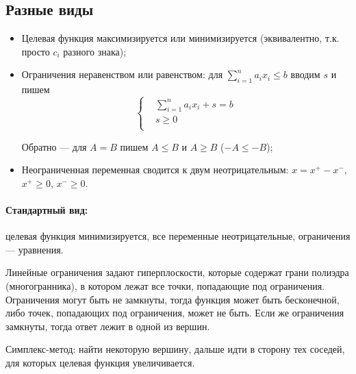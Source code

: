 \subsection{Разные виды}
\begin{itemize}
    \item Целевая функция максимизируется или минимизируется
    (эквивалентно, т.к. просто $c_i$ разного знака);

    \item Ограничения неравенством или равенством:
    для $\sum_{i=1}^n a_i x_i \le b$
    вводим $s$ и пишем
    \[
        \left\{
        \begin{aligned}
            & \sum_{i=1}^n a_i x_i + s = b \\
            & s \ge 0 \\
        \end{aligned}
        \right.
    \]

    Обратно --- для $A = B$ пишем $A \le B$ и $A \ge B$ ($-A \le -B$);

    \item Неограниченная переменная сводится к двум неотрицательным:
    $x = x^+ - x^-$, $x^+ \ge 0$, $x^- \ge 0$.
\end{itemize}

\paragraph{Стандартный вид:}
целевая функция минимизируется,
все переменные неотрицательные,
ограничения --- уравнения.

Линейные ограничения задают гиперплоскости,
которые содержат грани полиэдра (многогранника),
в котором лежат все точки, попадающие под ограничения.
Ограничения могут быть не замкнуты,
тогда функция может быть бесконечной,
либо точек, попадающих под ограничения,
может не быть.
Если же ограничения замкнуты,
тогда ответ лежит в одной из вершин.

Симплекс-метод:
найти некоторую вершину,
дальше идти в сторону тех соседей,
для которых целевая функция увеличивается.
